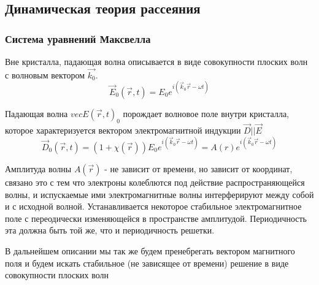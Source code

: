\subsection{Динамическая теория рассеяния}
  
  


 \subsubsection{Система уравнений Максвелла}

 Вне кристалла, падающая волна описывается в виде совокупности плоских волн с волновым вектором  $\vec{k_0}$.
 \begin{equation}
   \vec{E}_0(\vec{r},t) = E_0 e^{i(\vec{k}_0\vec{r}-\omega t)}
  \end{equation}

Падающая волна $vec{E}(\vec{r},t)_0$ порождает волновое поле внутри кристалла, которое характеризуется вектором
электромагнитной индукции $\vec{D}||\vec{E}$
\begin{equation}
  \vec{D}_0(\vec{r},t) = (1+\chi(\vec{r})) E_0 e^{i(\vec{k}_0\vec{r}-\omega t)} = A(r) e^{i(\vec{k}_0\vec{r}-\omega t)}
 \end{equation}

Амплитуда волны $A(\vec{r})$ - не зависит от времени, но зависит от координат, связано
это с тем что электроны колеблются под действие распространяющейся волны, и испускаемые ими
электромагнитные волны интерферируют между собой и с исходной волной. Устанавливается некоторое стабильное
электромагнитное поле с переодически изменяющейся в пространстве амплитудой. Периодичность эта должна быть
той же, что и периодичность решетки.

 В дальнейшем описании мы так же будем пренебрегать вектором магнитного поля и
 будем искать стабильное (не зависящее от времени) решение в виде совокупности плоских волн
